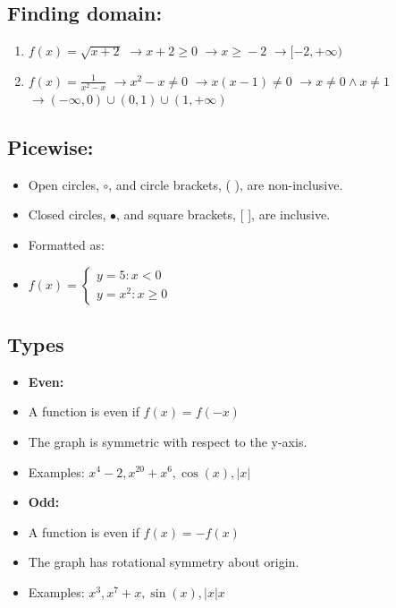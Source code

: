 \documentclass[12pt]{article}
\begin{document}
\subsection{Finding domain:}
\begin{enumerate}
    \item $f(x) = \sqrt{x+2}$
    $\rightarrow{} x + 2 \geq{} 0$
    $\rightarrow{} x \geq{} -2 $
    $\rightarrow{} [-2, +\infty)$
    
    \item $f(x) = \frac{1}{x^2-x} $
    $\rightarrow{} x^2-x \neq{} 0 $
    $\rightarrow{} x(x-1) \neq{} 0 $
    $\rightarrow{} x \neq{} 0 \wedge x \neq 1 $
    $\rightarrow{} (-\infty, 0) \cup (0, 1) \cup (1, +\infty)$
\end{enumerate}

\subsection{Picewise:}
\begin{itemize}
    \item Open circles, $\circ$, and circle brackets, ( ), are non-inclusive.
    \item Closed circles, $\bullet$, and square brackets, [ ], are inclusive.
    \item Formatted as: 
    \item[] $f(x)=\begin{cases} 
              y=5   : x < 0 \\
              y=x^2 : x\geq 0 
            \end{cases}$
\end{itemize}

\subsection{Types}
\begin{itemize}
    \item[] \textbf{Even: }
    \item A function is even if $f(x) = f(-x)$
    \item The graph is symmetric with respect to the y-axis.
    \item Examples: $x^4 - 2, x^{20}+x^6, \cos(x), |x|$

\end{itemize}

\begin{itemize}
    \item[] \textbf{Odd: }
    \item A function is even if $f(x) = -f(x)$
    \item The graph has rotational symmetry about origin.
    \item Examples: $x^3, x^{7}+x, \sin(x), |x|x$
\end{itemize}
\end{document}
